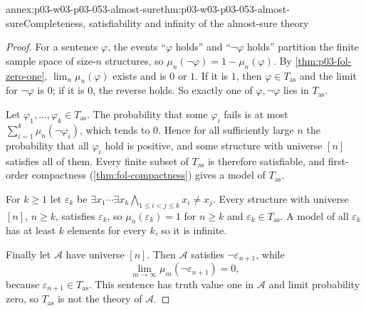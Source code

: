 \begin{annexitem}{annex:p03-w03-p03-053-almost-sure}{thm:p03-w03-p03-053-almost-sure}{Completeness, satisfiability and infinity of the almost-sure theory}
\begin{proof}
For a sentence \(\varphi\), the events ``\(\varphi\) holds'' and
``\(\neg\varphi\) holds'' partition the finite sample space of size-\(n\)
structures, so \(\mu_n(\neg\varphi)=1-\mu_n(\varphi)\). By
\cref{thm:p03-fol-zero-one}, \(\lim_n\mu_n(\varphi)\) exists and is
\(0\) or \(1\). If it is \(1\), then \(\varphi\in T_{\mathrm{as}}\) and the
limit for \(\neg\varphi\) is \(0\); if it is \(0\), the reverse holds.
So exactly one of \(\varphi,\neg\varphi\) lies in \(T_{\mathrm{as}}\).

Let \(\varphi_1,\ldots,\varphi_k\in T_{\mathrm{as}}\). The probability
that some \(\varphi_i\) fails is at most
\(\sum_{i=1}^k\mu_n(\neg\varphi_i)\), which tends to \(0\). Hence for all
sufficiently large \(n\) the probability that all \(\varphi_i\) hold is
positive, and some structure with universe \([n]\) satisfies all of them.
Every finite subset of \(T_{\mathrm{as}}\) is therefore satisfiable, and
first-order compactness (\cref{thm:fol-compactness}) gives a model
of \(T_{\mathrm{as}}\).

For \(k\ge1\) let \(\varepsilon_k\) be
\(\exists x_1\cdots\exists x_k\bigwedge_{1\le i<j\le k}x_i\neq x_j\).
Every structure with universe \([n]\), \(n\ge k\), satisfies
\(\varepsilon_k\), so \(\mu_n(\varepsilon_k)=1\) for \(n\ge k\) and
\(\varepsilon_k\in T_{\mathrm{as}}\). A model of all \(\varepsilon_k\)
has at least \(k\) elements for every \(k\), so it is infinite.

Finally let \(\mathcal A\) have universe \([n]\). Then
\(\mathcal A\) satisfies \(\neg\varepsilon_{n+1}\), while
\[
 \lim_{m\to\infty}\mu_m(\neg\varepsilon_{n+1})=0,
\]
because \(\varepsilon_{n+1}\in T_{\mathrm{as}}\). This sentence has truth value
one in \(\mathcal A\) and limit probability zero, so
\(T_{\mathrm{as}}\) is not the theory of \(\mathcal A\).
\end{proof}
\end{annexitem}

